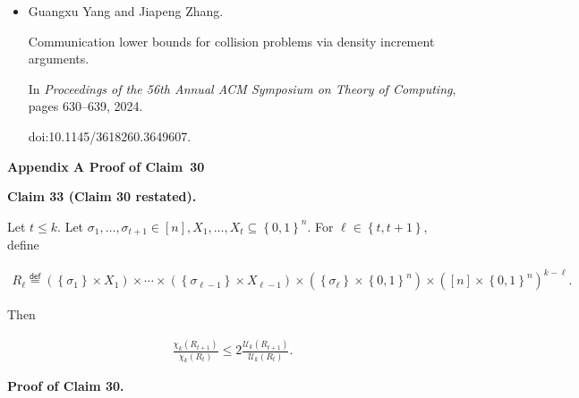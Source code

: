 \documentclass[10pt,a4paper]{article}
\begin{document}
\begin{itemize}
doi:10.4230/LIPIcs.CCC.2018.9.





\item[] 
[46]

Guangxu Yang and Jiapeng Zhang.


Communication lower bounds for collision problems via density
increment arguments.


In \emph{Proceedings of the 56th Annual ACM Symposium on Theory of
Computing}, pages 630–639, 2024.


doi:10.1145/3618260.3649607.





\end{itemize}




\par\medskip\noindent\textbf{
Appendix A Proof of Claim 30
}\par





\par\medskip\noindent\textbf{
Claim 33 (Claim 30 restated). 
}\par



Let $t\leq k$.
Let $\sigma_{1},\dots,\sigma_{t+1}\in[n],X_{1},\dots,X_{t}\subseteq\left\{0,1\right\}^{n}$.
For $\ell\in\left\{t,t+1\right\}$, define\par


\[\begin{gathered}
R_{\ell}\stackrel{{\scriptstyle\mathsf{def}}}{{=}}(\left\{\sigma_{1}\right\}\times X_{1})\times\cdots\times(\left\{\sigma_{\ell-1}\right\}\times X_{\ell-1})\times(\left\{\sigma_{\ell}\right\}\times\left\{0,1\right\}^{n})\times([n]\times\left\{0,1\right\}^{n})^{k-\ell}.
\end{gathered}\]


Then\par


\[\begin{gathered}
\frac{\chi_{k}(R_{t+1})}{\chi_{k}(R_{t})}\leq 2\frac{\mathcal{U}_{k}(R_{t+1})}{\mathcal{U}_{k}(R_{t})}.
\end{gathered}\]






\par\medskip\noindent\textbf{
\textbf{Proof of Claim 30}.}\par
\end{document}
